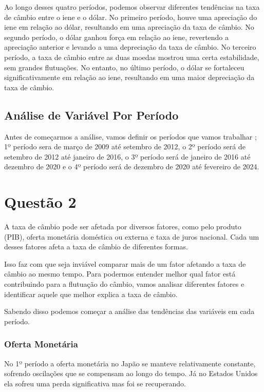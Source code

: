 \documentclass[a4paper,12pt]{article}[abntex2]
\begin{document}
Ao longo desses quatro períodos, podemos observar diferentes tendências na taxa de câmbio entre o iene e o dólar. No primeiro período, houve uma apreciação do iene em relação ao dólar, resultando em uma apreciação da taxa de câmbio. No segundo período, o dólar ganhou força em relação ao iene, revertendo a apreciação anterior e levando a uma depreciação da taxa de câmbio. No terceiro período, a taxa de câmbio entre as duas moedas mostrou uma certa estabilidade, sem grandes flutuações. No entanto, no último período, o dólar se fortaleceu significativamente em relação ao iene, resultando em uma maior depreciação da taxa de câmbio.

\subsection{\textbf{Análise de Variável Por Período}}
Antes de começarmos a análise, vamos definir os períodos que vamos trabalhar ; 1º período sera de março de 2009 até setembro de 2012, o 2º período será de setembro de 2012 até janeiro de 2016, o 3º período será   de janeiro de 2016 até dezembro de 2020 e o 4º período será de dezembro de 2020 até fevereiro de 2024.

    
\section{\textbf{Questão 2}}
A taxa de câmbio pode ser afetada por diversos fatores, como pelo produto (PIB), oferta monetária doméstica ou externa e taxa de juros nacional. Cada um desses fatores afeta a taxa de câmbio de diferentes formas.

Isso faz com que seja inviável comparar mais de um fator afetando a taxa de câmbio ao mesmo tempo. Para podermos entender melhor qual fator está contribuindo para a flutuação do câmbio, vamos analisar diferentes fatores e identificar aquele que melhor explica a taxa de câmbio.  

Sabendo disso podemos começar a análise das tendências das variáveis em cada período.

\subsubsection{\textbf{Oferta Monetária}}

No 1º período a oferta monetária no Japão se manteve relativamente constante, sofrendo oscilações que se compensam ao longo do tempo. Já no Estados Unidos ela sofreu uma perda significativa mas foi se recuperando.
\end{document}
